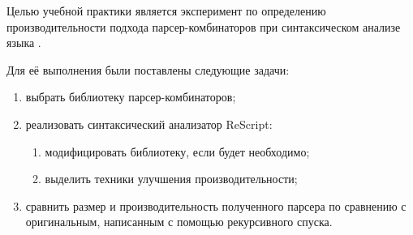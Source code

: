 Целью учебной практики является эксперимент по определению производительности подхода
парсер-комбинаторов при синтаксическом анализе языка \ReScript{}.

Для её выполнения были поставлены следующие задачи:
\begin{enumerate}
  \item выбрать библиотеку парсер-комбинаторов;
  \item реализовать синтаксический анализатор ReScript:
      \begin{enumerate}
          \item модифицировать библиотеку, если будет необходимо;
          \item выделить техники улучшения производительности;
      \end{enumerate}
  \item сравнить размер и производительность полученного парсера по сравнению с оригинальным, написанным с помощью рекурсивного спуска.
\end{enumerate}
